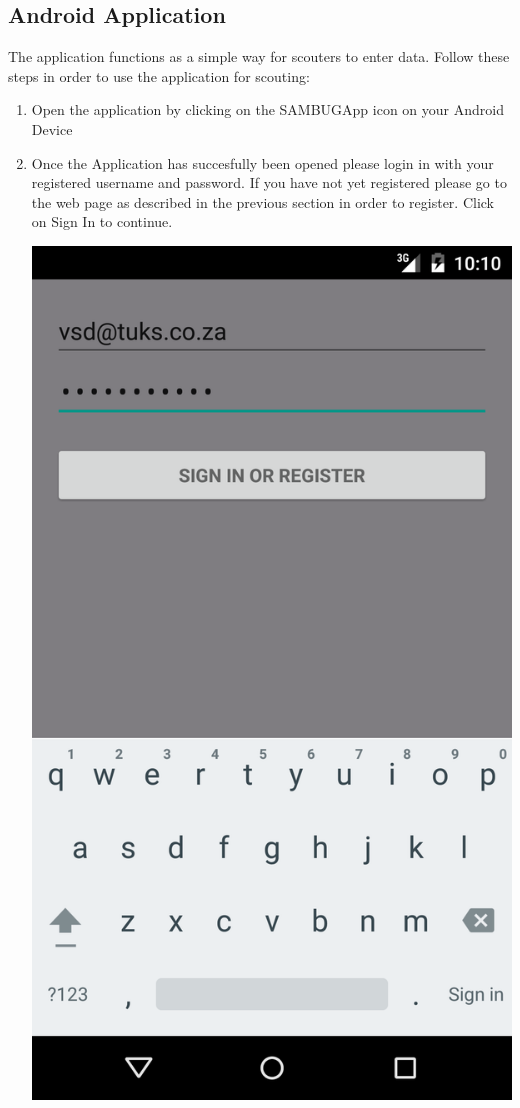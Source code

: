 \documentclass[11pt,a4paper,titlepage]{article}
\begin{document}
\subsection{Android Application}
	The application functions as a simple way for scouters to enter data. Follow these steps in order to use the application for scouting:
	\begin{enumerate}
		\item Open the application by clicking on the SAMBUGApp icon on your Android Device
		\item Once the Application has succesfully been opened please login in with your registered username and password. If you have not yet registered please go to the web page as described in the previous section in order to register. Click on Sign In to continue.
			\begin{center}
				\includegraphics[scale=0.13]{shot1}

\end{center}
\end{enumerate}
\end{document}
